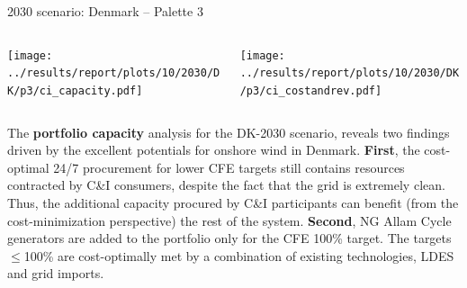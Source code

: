   \begin{frame}{2030 scenario: Denmark -- Palette 3}
  
    {\footnotesize
  
    \begin{columns}
    \begin{column}{7cm}
    \centering
    \texttt{[image: ../results/report/plots/10/2030/DK/p3/ci\_capacity.pdf]}
    \end{column}
  
    \begin{column}{8cm}
    \centering
    \texttt{[image: ../results/report/plots/10/2030/DK/p3/ci\_costandrev.pdf]}
    \end{column}
  
    \end{columns}
  
    \begin{columns}
    \begin{column}{15cm}
    The {\bf portfolio capacity} analysis for the DK-2030 scenario,
    reveals two findings driven by the excellent potentials for onshore wind in Denmark.
    {\bf First}, the cost-optimal 24/7 procurement for lower CFE targets
    still contains resources contracted by C\&I consumers, despite the fact that the grid is extremely clean.
    Thus, the additional capacity procured by C\&I participants can benefit 
    (from the cost-minimization perspective) the rest of the system.
    {\bf Second}, NG Allam Cycle generators are added to the portfolio \alert{only for the CFE 100\% target}. 
    The targets $\leq$100\% are cost-optimally met by a combination of existing technologies, LDES and grid imports. 
      
    \end{column}
    \end{columns}
    }
  
  \end{frame}



